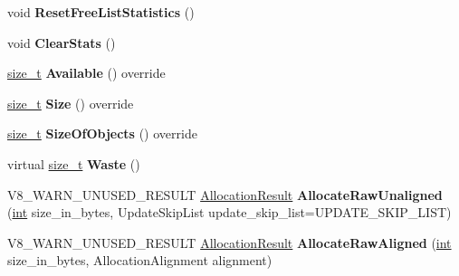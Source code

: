 \begin{DoxyCompactItemize}
\item 
\mbox{\label{classv8_1_1internal_1_1PagedSpace_a763d614a5b270ae54665785d55b4b2be}} 
void {\bfseries Reset\+Free\+List\+Statistics} ()
\item 
\mbox{\label{classv8_1_1internal_1_1PagedSpace_ab3bc3fb5a62e54da60ac8d6f84246287}} 
void {\bfseries Clear\+Stats} ()
\item 
\mbox{\label{classv8_1_1internal_1_1PagedSpace_adf937296bd07681d7bcc06ff42ccacf9}} 
\mbox{\hyperlink{classsize__t}{size\+\_\+t}} {\bfseries Available} () override
\item 
\mbox{\label{classv8_1_1internal_1_1PagedSpace_a08788a64693bb668317a11f667376d73}} 
\mbox{\hyperlink{classsize__t}{size\+\_\+t}} {\bfseries Size} () override
\item 
\mbox{\label{classv8_1_1internal_1_1PagedSpace_a9d66f8a7a4c69270d1f976be51c440ea}} 
\mbox{\hyperlink{classsize__t}{size\+\_\+t}} {\bfseries Size\+Of\+Objects} () override
\item 
\mbox{\label{classv8_1_1internal_1_1PagedSpace_abb4ab2c02b4ab90a01c70a0d448d1472}} 
virtual \mbox{\hyperlink{classsize__t}{size\+\_\+t}} {\bfseries Waste} ()
\item 
\mbox{\label{classv8_1_1internal_1_1PagedSpace_aed0b55e63b6f324531b20bf9d29cdee1}} 
V8\+\_\+\+W\+A\+R\+N\+\_\+\+U\+N\+U\+S\+E\+D\+\_\+\+R\+E\+S\+U\+LT \mbox{\hyperlink{classv8_1_1internal_1_1AllocationResult}{Allocation\+Result}} {\bfseries Allocate\+Raw\+Unaligned} (\mbox{\hyperlink{classint}{int}} size\+\_\+in\+\_\+bytes, Update\+Skip\+List update\+\_\+skip\+\_\+list=U\+P\+D\+A\+T\+E\+\_\+\+S\+K\+I\+P\+\_\+\+L\+I\+ST)
\item 
\mbox{\label{classv8_1_1internal_1_1PagedSpace_ae04e88837c5f6b417acc679a89707b93}} 
V8\+\_\+\+W\+A\+R\+N\+\_\+\+U\+N\+U\+S\+E\+D\+\_\+\+R\+E\+S\+U\+LT \mbox{\hyperlink{classv8_1_1internal_1_1AllocationResult}{Allocation\+Result}} {\bfseries Allocate\+Raw\+Aligned} (\mbox{\hyperlink{classint}{int}} size\+\_\+in\+\_\+bytes, Allocation\+Alignment alignment)

\end{DoxyCompactItemize}
